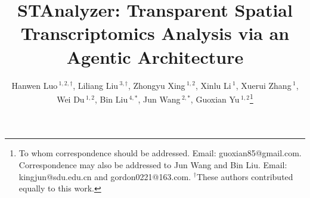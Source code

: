 \documentclass[a4,center,fleqn]{NAR}
\begin{document}

\title{STAnalyzer: Transparent Spatial Transcriptomics Analysis via an Agentic Architecture}

\author{
Hanwen Luo\,$^{1,2,\dagger}$,
Liliang Liu\,$^{3,\dagger}$,
Zhongyu Xing\,$^{1,2}$,
Xinlu Li\,$^{1}$,
Xuerui Zhang\,$^{1}$,
Wei Du\,$^{1,2}$,
Bin Liu\,$^{4,*}$, 
Jun Wang\,$^{2,*}$, 
Guoxian Yu\,$^{1,2}$\footnote{To whom correspondence should be addressed. Email: guoxian85@gmail.com. \newline Correspondence may also be addressed to Jun Wang and Bin Liu. Email: kingjun@sdu.edu.cn and gordon0221@163.com. \newline $^\dagger$These authors contributed equally to this work.}%
}


\address{%
$^{1}$School of Software, Shandong University, Jinan 250101, Shandong, China\\
$^{2}$SDU-NTU Centre for Artificial Intelligence Research, Shandong University, Jinan 250101, Shandong, China\\
$^{3}$Interdisciplinary Center, Shandong University, Jinan 250100, Shandong, China\\
$^{4}$Department of Interventional Medicine and Minimally Invasive Oncology, Shandong University, Jinan 250033, Shandong, China}




\maketitle
\end{document}
